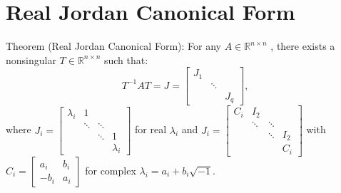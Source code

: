 \documentclass[10pt,a4paper,oneside]{article}
\begin{document}
\section{Real Jordan Canonical Form}
Theorem (Real Jordan Canonical Form):
For any $A \in \mathbb{R}^{n \times n}$ , there exists a nonsingular $T \in \mathbb{R}^{n \times n}$ such that:
\[
T^{-1} A T=J=\left[\begin{array}{ccc}{J_{1}} \\ {} & {\ddots} \\ {} & {} &{} {J_{q}}\end{array}\right],
\]
where $J_{i}=\left[\begin{array}{cccc}{\lambda_{i}} & {1} & {} & {} \\ {} & {\ddots} & {\ddots} & {} \\ {} & {} & {\ddots} & {1} \\ {} & {} & {} & {\lambda_{i}}\end{array}\right]$ for real $\lambda_i$ and $J_{i}=\left[\begin{array}{cccc}{C_{i}} & {I_{2}} & {} & {} \\ {} & {\ddots} & {\ddots} & {} \\ {} & {} & {\ddots} & {I_{2}} \\ {} & {} & {} & {C_{i}}\end{array}\right]$ with $C_{i}=\left[\begin{array}{ll}{a_{i}} & {b_{i}} \\ {-b_{i}} & {a_{i}}\end{array}\right]$ for complex $\lambda_{i}=a_{i}+b_{i} \sqrt{-1}$.
\end{document}
